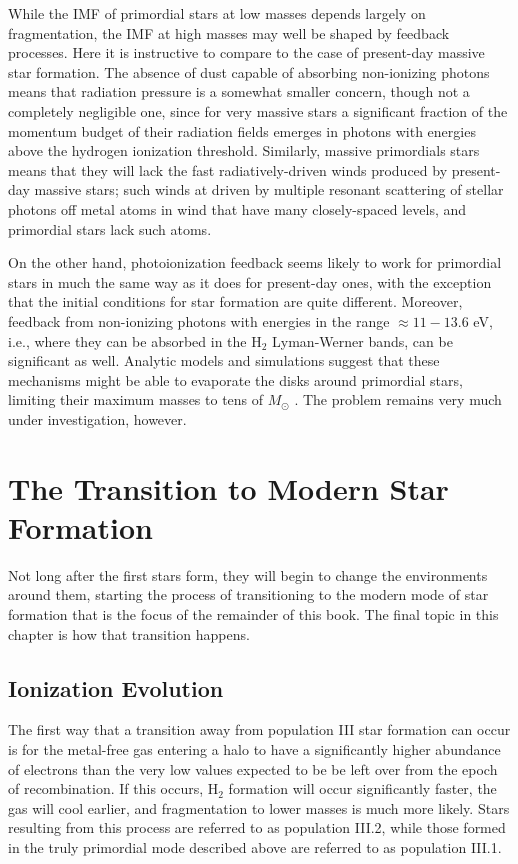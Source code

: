 While the IMF of primordial stars at low masses depends largely on fragmentation, the IMF at high masses may well be shaped by feedback processes. Here it is instructive to compare to the case of present-day massive star formation. The absence of dust capable of absorbing non-ionizing photons means that radiation pressure is a somewhat smaller concern, though not a completely negligible one, since for very massive stars a significant fraction of the momentum budget of their radiation fields emerges in photons with energies above the hydrogen ionization threshold. Similarly, massive primordials stars means that they will lack the fast radiatively-driven winds produced by present-day massive stars; such winds at driven by multiple resonant scattering of stellar photons off metal atoms in wind that have many closely-spaced levels, and primordial stars lack such atoms.

On the other hand, photoionization feedback seems likely to work for primordial stars in much the same way as it does for present-day ones, with the exception that the initial conditions for star formation are quite different. Moreover, feedback from non-ionizing photons with energies in the range $\approx 11-13.6$ eV, i.e., where they can be absorbed in the H$_2$ Lyman-Werner bands, can be significant as well. Analytic models and simulations suggest that these mechanisms might be able to evaporate the disks around primordial stars, limiting their maximum masses to tens of $M_\odot$ \citep{mckee08a, hosokawa11b, stacy12a}. The problem remains very much under investigation, however.


\section{The Transition to Modern Star Formation}

Not long after the first stars form, they will begin to change the environments around them, starting the process of transitioning to the modern mode of star formation that is the focus of the remainder of this book. The final topic in this chapter is how that transition happens.

\subsection{Ionization Evolution}

The first way that a transition away from population III star formation can occur is for the metal-free gas entering a halo to have a significantly higher abundance of electrons than the very low values expected to be be left over from the epoch of recombination. If this occurs, H$_2$ formation will occur significantly faster, the gas will cool earlier, and fragmentation to lower masses is much more likely. Stars resulting from this process are referred to as population III.2, while those formed in the truly primordial mode described above are referred to as population III.1.

